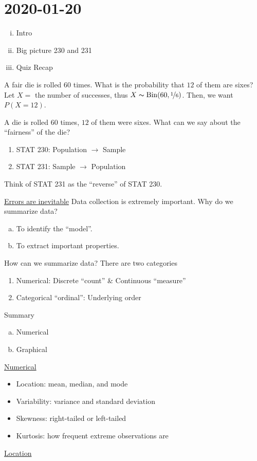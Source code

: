 \section{2020-01-20}
\begin{enumerate}[(i)]
    \item Intro
    \item Big picture 230 and 231
    \item Quiz Recap
\end{enumerate}
\begin{exbox}
    \begin{example}[STAT 230]
        A fair die is rolled $ 60 $ times. What is the
        probability that $ 12 $ of them are sixes?
        Let $ X= $ the number of successes, thus $ X \thicksim \operatorname{Bin}(60,\nicefrac{1}{6}) $.
        Then, we want $ P(X=12) $.
    \end{example}
\end{exbox}
\begin{exbox}
    \begin{example}[STAT 231]
        A die is rolled $ 60 $ times, $ 12 $ of them were sixes.
        What can we say about the ``fairness'' of the die?
    \end{example}
\end{exbox}
\begin{enumerate}
    \item STAT 230: Population $ \rightarrow $ Sample
    \item STAT 231: Sample $ \rightarrow $ Population
\end{enumerate}
Think of STAT 231 as the ``reverse'' of STAT 230.

\underline{Errors are inevitable} Data collection
is extremely important. Why do we summarize data?
\begin{enumerate}[(a)]
    \item To identify the ``model''.
    \item To extract important properties.
\end{enumerate}
How can we summarize data? There are two categories
\begin{enumerate}[(1)]
    \item Numerical: Discrete ``count'' \& Continuous ``measure''
    \item Categorical ``ordinal'': Underlying order
\end{enumerate}
Summary
\begin{enumerate}[(a)]
    \item Numerical
    \item Graphical
\end{enumerate}
\underline{Numerical}
\begin{itemize}
    \item Location: mean, median, and mode
    \item Variability: variance and standard deviation
    \item Skewness: right-tailed or left-tailed
    \item Kurtosis: how frequent extreme observations are
\end{itemize}
\underline{Location}

